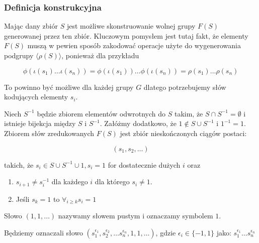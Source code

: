 \subsubsection{Definicja konstrukcyjna}
Mając dany zbiór $S$ jest możliwe skonstruowanie wolnej grupy $F(S)$ generowanej
przez ten zbiór. Kluczowym pomysłem jest tutaj fakt, że elementy $F(S)$ muszą w
pewien sposób zakodować operacje użyte do wygenerowania podgrupy
$\langle \rho(S) \rangle$, ponieważ dla przykładu

\[
\phi\left(\iota\left(s_1\right) \ldots \iota\left(s_n\right)\right)
=
\phi\left(\iota\left(s_1\right)\right) \ldots \phi\left(\iota\left(s_n\right)\right)
=
\rho\left(s_1\right)\ldots\rho\left(s_n\right)\]

To powinno być możliwe dla każdej grupy $G$ dlatego potrzebujemy słów kodujących
elementy $s_i$.

\begin{defin}
  Niech $S^{-1}$ będzie zbiorem elementów odwrotnych do $S$ takim, że $S \cap
  S^{-1} = \emptyset$ i istnieje bijekcja między $S$ i $S^{-1}$. Załóżmy
  dodatkowo, że $1 \not \in S \cup S^{-1}$ i $1^{-1} = 1$.  Zbiorem słów
  zredukowanych $F(S)$ jest zbiór nieskończonych ciągów postaci:

  \[(s_1, s_2, \ldots)\]

  takich, że $s_i \in S \cup S^{-1} \cup {1}, s_i = 1$ for dostatecznie dużych
  $i$ oraz

\begin{enumerate}
  \item $s_{i+1} \neq s_i^{-1}$ dla każdego $i$ dla którego $s_i \neq 1$.
  \item Jeśli $s_k = 1$ to $\forall_{i \geq k} s_i = 1$
\end{enumerate}
\end{defin}

Słowo $(1,1,\ldots)$ nazywamy słowem pustym i oznaczamy symbolem $1$.

Będziemy oznaczali słowo $
(s_1^{\epsilon_1},
s_2^{\epsilon_2}, \ldots
s_n^{\epsilon_n}, 1, 1, \ldots)$, gdzie $\epsilon_i \in \{-1, 1\}$ jako:
$s_1^{\epsilon_1}\ldots s_n^{\epsilon_n}$

